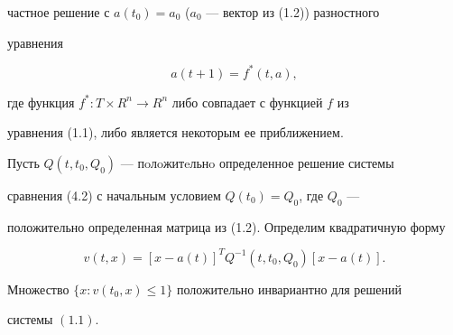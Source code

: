 частное решение с $a(t_0)=a_0$ ($a_0$ --- вектор из (1.2)) разностного


уравнения


\begin{equation}


a(t+1)=f^*(t,a),


\end{equation}


где функция $f^*:T\times R^n\to R^n$ либо совпадает с функцией $f$ из


уравнения (1.1), либо является некоторым ее приближением.





Пусть $Q(t,t_0,Q_0)$ --- пoлoжитeльнo определенное решение системы


сравнения (4.2) с начальным условием $Q(t_0)=Q_0$, где $Q_0$ ---


положительно определенная матрица из (1.2). Определим квадратичную форму


\begin{equation}


v(t,x)=[x-a(t)]^T Q^{-1}(t,t_0,Q_0)[x-a(t)].


\end{equation}





\begin{lem}


Множество $\{x:v(t_0,x)\le1\}$ положительно инвариантно для решений


системы $(1.1)$.


\end{lem}





